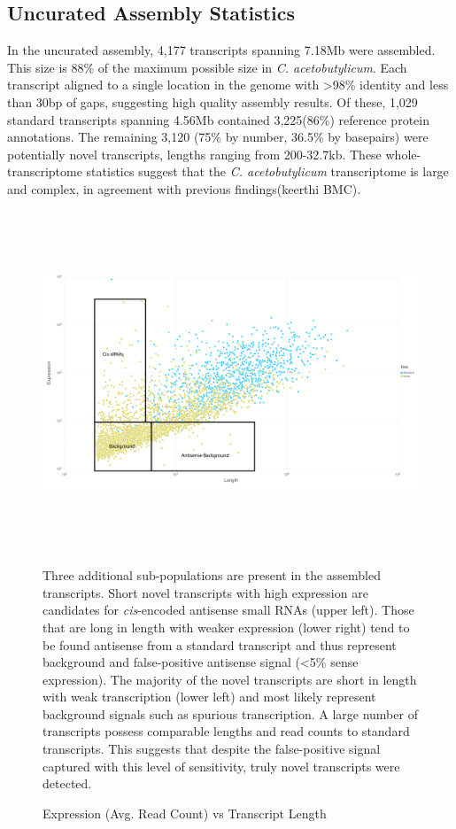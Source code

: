 \subsection{Uncurated Assembly Statistics}

In the uncurated assembly, 4,177 transcripts spanning 7.18Mb were assembled. This size is 88\% of the maximum possible size in \textit{C. acetobutylicum}. Each transcript aligned to a single location in the genome with \textgreater 98\% identity and less than 30bp of gaps, suggesting high quality assembly results. Of these, 1,029 standard transcripts spanning 4.56Mb contained 3,225(86\%) reference protein annotations. The remaining 3,120 (75\% by number, 36.5\% by basepairs) were potentially novel transcripts, lengths ranging from 200-32.7kb. These whole-transcriptome statistics suggest that the \textit{C. acetobutylicum} transcriptome is large and complex, in agreement with previous findings(keerthi BMC).

\begin{figure}[h!]
\small
\begin{center}
\includegraphics[width=\textwidth,height=4in]{images/Assembly/Summary/Depth_vs_length.png}
\end{center}
\caption{Expression (Avg. Read Count) vs Transcript Length}\label{fig:5.3}
Three additional sub-populations are present in the assembled transcripts. Short novel transcripts with high expression are candidates for \textit{cis}-encoded antisense small RNAs (upper left). Those that are long in length with weaker expression (lower right) tend to be found antisense from a standard transcript and thus represent background and false-positive antisense signal (\textless 5\% sense expression). The majority of the novel transcripts are short in length with weak transcription (lower left) and most likely represent background signals such as spurious transcription. A large number of transcripts possess comparable lengths and read counts to standard transcripts. This suggests that despite the false-positive signal captured with this level of sensitivity, truly novel transcripts were detected.
\end{figure}

